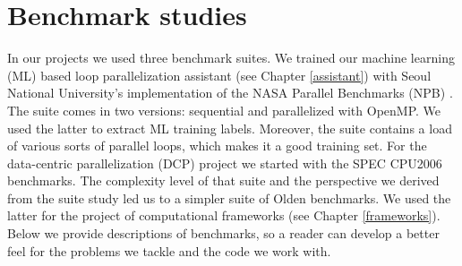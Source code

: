 \section{Benchmark studies}
\label{background_benchmarks}
\quad In our projects we used three benchmark suites. We trained our machine learning (ML) based loop parallelization assistant \cite{assistant-aiseps} (see Chapter \ref{assistant}) with Seoul National University's implementation \cite{snu-npb-benchmarks} of the NASA Parallel Benchmarks (NPB) \cite{snu-npb-benchmarks}. The suite comes in two versions: sequential and parallelized with OpenMP. We used the latter to extract ML training labels. Moreover, the suite contains a load of various sorts of parallel loops, which makes it a good training set. For the data-centric parallelization (DCP) project we started with the SPEC CPU2006 benchmarks. The complexity level of that suite and the perspective we derived from the suite study led us to a simpler suite of Olden benchmarks. We used the latter for the project of computational frameworks (see Chapter \ref{frameworks}). Below we provide descriptions of benchmarks, so a reader can develop a better feel for the problems we tackle and the code we work with.
